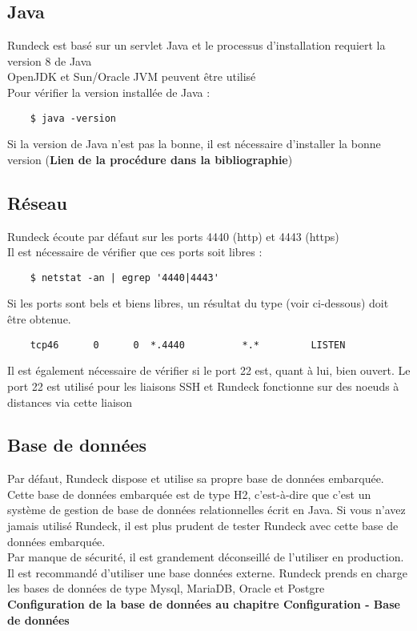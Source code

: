 \documentclass[12pt]{article}
\begin{document}
\subsection{Java}
Rundeck est basé sur un servlet Java et le processus d'installation requiert la version 8 de Java
\\
OpenJDK et Sun/Oracle JVM peuvent être utilisé
\\
Pour vérifier la version installée de Java : 
\begin{lstlisting}
    $ java -version
\end{lstlisting}
Si la version de Java n'est pas la bonne, il est nécessaire d'installer la bonne version (\textbf{Lien de la procédure dans la bibliographie})

\subsection{Réseau}
Rundeck écoute par défaut sur les ports 4440 (http) et 4443 (https)
\\
Il est nécessaire de vérifier que ces ports soit libres : 
\begin{lstlisting}
    $ netstat -an | egrep '4440|4443'
\end{lstlisting}
Si les ports sont bels et biens libres, un résultat du type (voir ci-dessous) doit être obtenue.
\begin{lstlisting}
    tcp46      0      0  *.4440          *.*         LISTEN
\end{lstlisting}

Il est également nécessaire de vérifier si le port 22 est, quant à lui, bien ouvert. Le port 22 est utilisé pour les liaisons SSH et Rundeck fonctionne sur des noeuds à distances via cette liaison

\subsection{Base de données}
Par défaut, Rundeck dispose et utilise sa propre base de données embarquée. Cette base de données embarquée est de type H2, c'est-à-dire que c'est un système de gestion de base de données relationnelles écrit en Java. Si vous n'avez jamais utilisé Rundeck, il est plus prudent de tester Rundeck avec cette base de données embarquée.
\\
Par manque de sécurité, il est grandement déconseillé de l'utiliser en production.
\\
Il est recommandé d'utiliser une base données externe. Rundeck prends en charge les bases de données de type Mysql, MariaDB, Oracle et Postgre
\vspace{0.5cm}
\\
\textbf{Configuration de la base de données au chapitre Configuration - Base de données}
\end{document}
